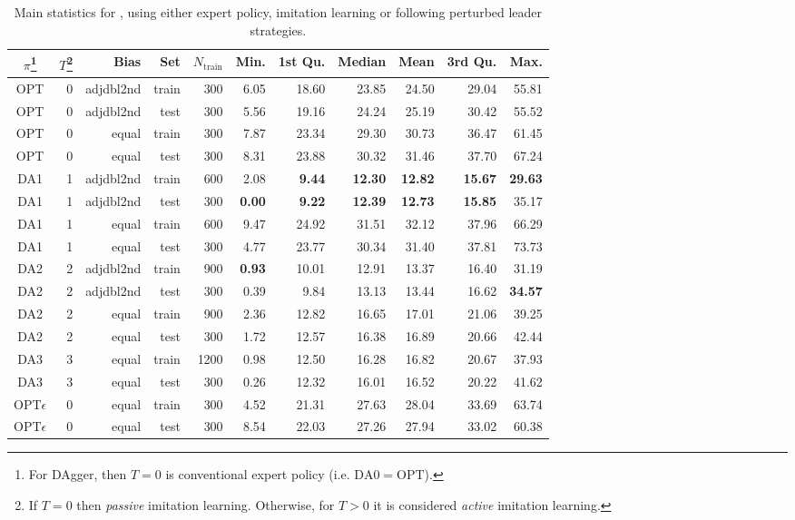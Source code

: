 \begin{table*}[t]    
\caption{Main statistics for  \namerho, using either expert
   policy, imitation learning or following perturbed leader 
   strategies.}\label{tbl:IL:stats} 
\noindent
\begin{minipage}{\textwidth}
\centering
\begin{tabular}{c@{}rrrrrrrrrr}
  \toprule
  $\pi$\footnote{For DAgger, then $T=0$ is conventional expert policy (i.e. 
  $\text{DA}0=\text{OPT}$).}
  & $T$\footnote{If $T=0$ then \emph{passive} imitation learning. 
  Otherwise, for $T>0$ it is considered \emph{active} imitation learning.}
  & Bias & Set & $N_{\text{train}}$ & Min. & 1st Qu. & Median & 
  Mean & 3rd Qu. & Max. \\ 
  \midrule  
  OPT & 0 & adjdbl2nd & train & 300 & 6.05 & 18.60 & 23.85 & 24.50 & 
  29.04 & 55.81 \\ 
  OPT & 0 & adjdbl2nd & test & 300 & 5.56 & 19.16 & 24.24 & 25.19 & 
  30.42 & 55.52 \\ 
  OPT & 0 & equal & train & 300 & 7.87 & 23.34 & 29.30 & 30.73 & 36.47 & 
  61.45 \\ 
  OPT & 0 & equal & test & 300 & 8.31 & 23.88 & 30.32 & 31.46 & 37.70 & 
  67.24 \\ 
  DA1 & 1 & adjdbl2nd & train & 600 & 2.08 & \textbf{9.44} & \textbf{12.30} & 
  \textbf{12.82} & \textbf{15.67} & \textbf{29.63} \\ 
  DA1 & 1 & adjdbl2nd & test & 300 & \textbf{0.00} & \textbf{9.22} & 
  \textbf{12.39} & \textbf{12.73} & \textbf{15.85} & 35.17 \\ 
  DA1 & 1 & equal & train & 600 & 9.47 & 24.92 & 31.51 & 32.12 & 37.96 & 
  66.29 \\ 
  DA1 & 1 & equal & test & 300 & 4.77 & 23.77 & 30.34 & 31.40 & 37.81 & 
  73.73 \\ 
  DA2 & 2 & adjdbl2nd & train & 900 & \textbf{0.93} & 10.01 & 12.91 & 13.37 & 
  16.40 & 31.19 \\ 
  DA2 & 2 & adjdbl2nd & test & 300 & 0.39 & 9.84 & 13.13 & 13.44 & 16.62 
  & \textbf{34.57} \\ 
  DA2 & 2 & equal & train & 900 & 2.36 & 12.82 & 16.65 & 17.01 & 21.06 & 
  39.25 \\ 
  DA2 & 2 & equal & test & 300 & 1.72 & 12.57 & 16.38 & 16.89 & 20.66 & 
  42.44 \\ 
  DA3 & 3 & equal & train & 1200 & 0.98 & 12.50 & 16.28 & 16.82 & 20.67 & 
  37.93 \\ 
  DA3 & 3 & equal & test & 300 & 0.26 & 12.32 & 16.01 & 16.52 & 20.22 & 
  41.62 \\ 
  \midrule
  OPT$\epsilon$ & 0 & equal & train & 300 & 4.52 & 21.31 & 27.63 & 28.04 & 
  33.69 & 63.74 \\ 
  OPT$\epsilon$ & 0 & equal & test & 300 & 8.54 & 22.03 & 27.26 & 27.94 & 33.02 
  & 60.38 \\ 
  \bottomrule
\end{tabular}
\end{minipage}
\end{table*}